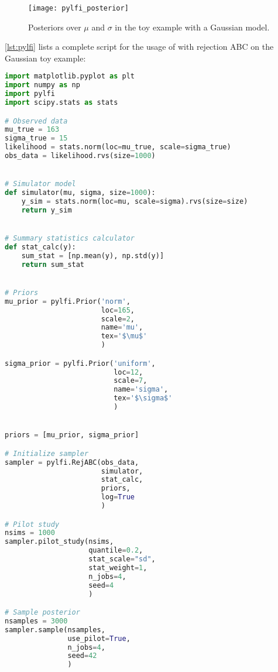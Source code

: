 \begin{figure}[H]
\begin{center}\texttt{[image: pylfi\_posterior]}
\end{center}
\caption{Posteriors over $\mu$ and $\sigma$ in the toy example with a Gaussian model.}
\end{figure}


\cref{lst:pylfi} lists a complete script for the usage of  with rejection ABC on the Gaussian toy example: 

\begin{lstlisting}[language=python, label={lst:pylfi}, caption={Example usage of the pyLFI on a Gaussian toy model.}]
import matplotlib.pyplot as plt
import numpy as np
import pylfi
import scipy.stats as stats

# Observed data
mu_true = 163
sigma_true = 15
likelihood = stats.norm(loc=mu_true, scale=sigma_true)
obs_data = likelihood.rvs(size=1000)


# Simulator model
def simulator(mu, sigma, size=1000):
    y_sim = stats.norm(loc=mu, scale=sigma).rvs(size=size)
    return y_sim


# Summary statistics calculator
def stat_calc(y):
    sum_stat = [np.mean(y), np.std(y)]
    return sum_stat


# Priors
mu_prior = pylfi.Prior('norm',
                       loc=165,
                       scale=2,
                       name='mu',
                       tex='$\mu$'
                       )

sigma_prior = pylfi.Prior('uniform',
                          loc=12,
                          scale=7,
                          name='sigma',
                          tex='$\sigma$'
                          )


priors = [mu_prior, sigma_prior]

# Initialize sampler
sampler = pylfi.RejABC(obs_data,
                       simulator,
                       stat_calc,
                       priors,
                       log=True
                       )

# Pilot study
nsims = 1000
sampler.pilot_study(nsims,
                    quantile=0.2,
                    stat_scale="sd",
                    stat_weight=1,
                    n_jobs=4,
                    seed=4
                    )

# Sample posterior
nsamples = 3000
sampler.sample(nsamples,
               use_pilot=True,
               n_jobs=4,
               seed=42
               )


\end{lstlisting}
